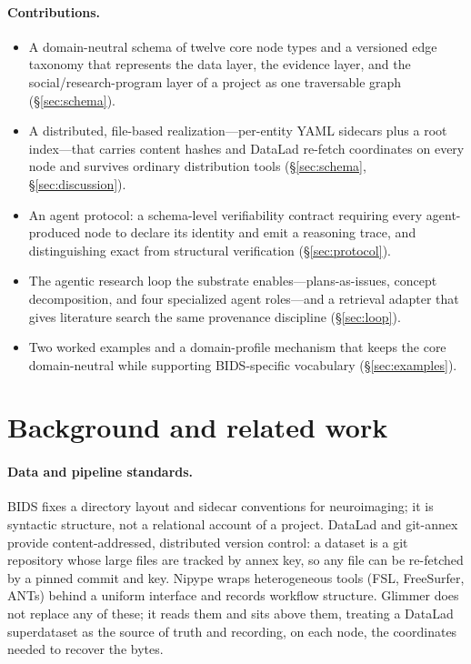 \documentclass[preprint]{glimmer-paper}
\begin{document}
\paragraph{Contributions.}
\begin{itemize}
  \item A domain-neutral schema of twelve core node types and a versioned edge taxonomy
  that represents the data layer, the evidence layer, and the social/research-program
  layer of a project as one traversable graph (\S\ref{sec:schema}).
  \item A distributed, file-based realization---per-entity YAML sidecars plus a root
  index---that carries content hashes and DataLad re-fetch coordinates on every node and
  survives ordinary distribution tools (\S\ref{sec:schema}, \S\ref{sec:discussion}).
  \item An agent protocol: a schema-level verifiability contract requiring every
  agent-produced node to declare its identity and emit a reasoning trace, and
  distinguishing exact from structural verification (\S\ref{sec:protocol}).
  \item The agentic research loop the substrate enables---plans-as-issues, concept
  decomposition, and four specialized agent roles---and a retrieval adapter that gives
  literature search the same provenance discipline (\S\ref{sec:loop}).
  \item Two worked examples and a domain-profile mechanism that keeps the core
  domain-neutral while supporting BIDS-specific vocabulary (\S\ref{sec:examples}).
\end{itemize}

\section{Background and related work}
\label{sec:background}

\paragraph{Data and pipeline standards.} BIDS \citep{gorgolewski2016bids} fixes a
directory layout and sidecar conventions for neuroimaging; it is syntactic structure, not
a relational account of a project. DataLad and git-annex \citep{halchenko2021datalad}
provide content-addressed, distributed version control: a dataset is a git repository
whose large files are tracked by annex key, so any file can be re-fetched by a pinned
commit and key. Nipype \citep{gorgolewski2011nipype} wraps heterogeneous tools (FSL,
FreeSurfer, ANTs) behind a uniform interface and records workflow structure. Glimmer does
not replace any of these; it reads them and sits above them, treating a DataLad
superdataset as the source of truth and recording, on each node, the coordinates needed to
recover the bytes.
\end{document}
